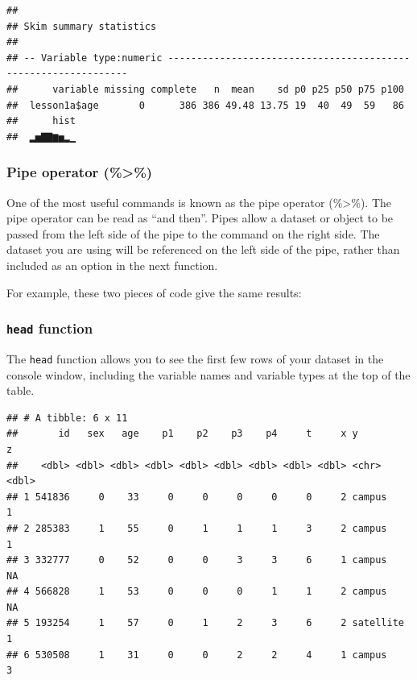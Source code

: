 \documentclass[]{book}
\newenvironment{Shaded}{\begin{snugshade}}{\end{snugshade}}
\newcommand{\KeywordTok}[1]{\textcolor[rgb]{0.13,0.29,0.53}{\textbf{#1}}}
\newcommand{\NormalTok}[1]{#1}
\newcommand{\OperatorTok}[1]{\textcolor[rgb]{0.81,0.36,0.00}{\textbf{#1}}}
\newcommand{\StringTok}[1]{\textcolor[rgb]{0.31,0.60,0.02}{#1}}
\begin{document}
\begin{Shaded}
\end{Shaded}

\begin{verbatim}
## 
## Skim summary statistics
## 
## -- Variable type:numeric ---------------------------------------------------------------
##      variable missing complete   n  mean    sd p0 p25 p50 p75 p100
##  lesson1a$age       0      386 386 49.48 13.75 19  40  49  59   86
##      hist
##  ▂▅▇▇▆▅▂▁
\end{verbatim}

\hypertarget{pipe-operator}{%
\subsubsection{Pipe operator (\%\textgreater\%)}\label{pipe-operator}}

One of the most useful commands is known as the pipe operator (\%\textgreater\%). The pipe operator can be read as ``and then''. Pipes allow a dataset or object to be passed from the left side of the pipe to the command on the right side. The dataset you are using will be referenced on the left side of the pipe, rather than included as an option in the next function.

For example, these two pieces of code give the same results:

\hypertarget{head-function}{%
\subsubsection{\texorpdfstring{\texttt{head} function}{head function}}\label{head-function}}

The \texttt{head} function allows you to see the first few rows of your dataset in the console window, including the variable names and variable types at the top of the table.

\begin{Shaded}
\end{Shaded}

\begin{verbatim}
## # A tibble: 6 x 11
##       id   sex   age    p1    p2    p3    p4     t     x y             z
##    <dbl> <dbl> <dbl> <dbl> <dbl> <dbl> <dbl> <dbl> <dbl> <chr>     <dbl>
## 1 541836     0    33     0     0     0     0     0     2 campus        1
## 2 285383     1    55     0     1     1     1     3     2 campus        1
## 3 332777     0    52     0     0     3     3     6     1 campus       NA
## 4 566828     1    53     0     0     0     1     1     2 campus       NA
## 5 193254     1    57     0     1     2     3     6     2 satellite     1
## 6 530508     1    31     0     0     2     2     4     1 campus        3
\end{verbatim}
\end{document}
